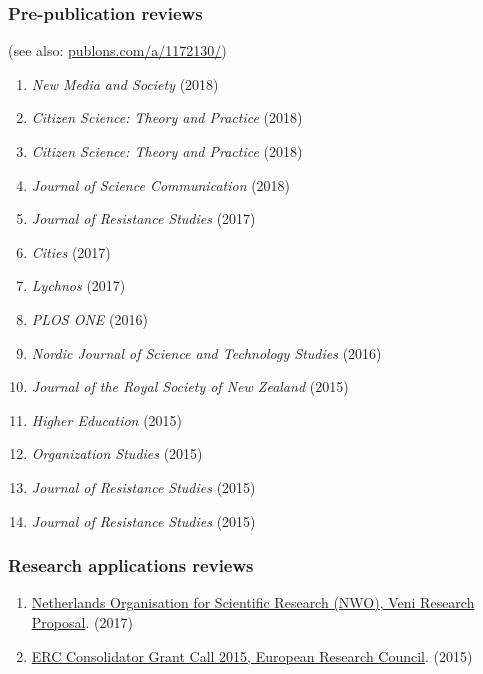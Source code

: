 \documentclass[
]{article}
\providecommand{\tightlist}{%
  \setlength{\itemsep}{0pt}\setlength{\parskip}{0pt}}
\begin{document}
\hypertarget{pre-publication-reviews}{%
\subsubsection{Pre-publication reviews}\label{pre-publication-reviews}}

(see also: \url{publons.com/a/1172130/})

\begin{enumerate}
\def\labelenumi{\arabic{enumi}.}
\tightlist
\item
  \emph{New Media and Society} (2018)
\item
  \emph{Citizen Science: Theory and Practice} (2018)
\item
  \emph{Citizen Science: Theory and Practice} (2018)
\item
  \emph{Journal of Science Communication} (2018)
\item
  \emph{Journal of Resistance Studies} (2017)
\item
  \emph{Cities} (2017)
\item
  \emph{Lychnos} (2017)
\item
  \emph{PLOS ONE} (2016)
\item
  \emph{Nordic Journal of Science and Technology Studies} (2016)
\item
  \emph{Journal of the Royal Society of New Zealand} (2015)
\item
  \emph{Higher Education} (2015)
\item
  \emph{Organization Studies} (2015)
\item
  \emph{Journal of Resistance Studies} (2015)
\item
  \emph{Journal of Resistance Studies} (2015)
\end{enumerate}

\hypertarget{research-applications-reviews}{%
\subsubsection{Research applications
reviews}\label{research-applications-reviews}}

\begin{enumerate}
\def\labelenumi{\arabic{enumi}.}
\tightlist
\item
  \href{http://files.christopherkullenberg.se/NWOreview.pdf}{Netherlands
  Organisation for Scientific Research (NWO), Veni Research Proposal}.
  (2017)
\item
  \href{http://files.christopherkullenberg.se/erc.pdf}{ERC Consolidator
  Grant Call 2015, European Research Council}. (2015)
\end{enumerate}
\end{document}
